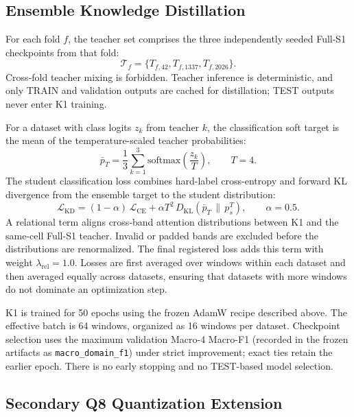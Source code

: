 \subsection{Ensemble Knowledge Distillation}
\label{subsec:distillation}

For each fold $f$, the teacher set comprises the three independently seeded Full-S1 checkpoints from that fold:
\begin{equation}
  \mathcal{T}_f = \{T_{f,42},T_{f,1337},T_{f,2026}\}.
\end{equation}
Cross-fold teacher mixing is forbidden. Teacher inference is deterministic, and only TRAIN and validation outputs are cached for distillation; TEST outputs never enter K1 training.

For a dataset with class logits $z_k$ from teacher $k$, the classification soft target is the mean of the temperature-scaled teacher probabilities:
\begin{equation}
  \bar{p}_T = \frac{1}{3}\sum_{k=1}^{3}\mathrm{softmax}\left(\frac{z_k}{T}\right),
  \qquad T=4.
\end{equation}
The student classification loss combines hard-label cross-entropy and forward KL divergence from the ensemble target to the student distribution:
\begin{equation}
\mathcal{L}_{\mathrm{KD}}=
(1-\alpha)\,\mathcal{L}_{\mathrm{CE}}+
\alpha T^2\,D_{\mathrm{KL}}\!\left(\bar{p}_T\,\|\,p_s^T\right),
\qquad \alpha=0.5.
\end{equation}
A relational term aligns cross-band attention distributions between K1 and the same-cell Full-S1 teacher. Invalid or padded bands are excluded before the distributions are renormalized. The final registered loss adds this term with weight $\lambda_{\mathrm{rel}}=1.0$. Losses are first averaged over windows within each dataset and then averaged equally across datasets, ensuring that datasets with more windows do not dominate an optimization step.

K1 is trained for 50 epochs using the frozen AdamW recipe described above. The effective batch is 64 windows, organized as 16 windows per dataset. Checkpoint selection uses the maximum validation Macro-4 Macro-F1 (recorded in the frozen artifacts as \texttt{macro\_domain\_f1}) under strict improvement; exact ties retain the earlier epoch. There is no early stopping and no TEST-based model selection.

\subsection{Secondary Q8 Quantization Extension}
\label{subsec:q8}

